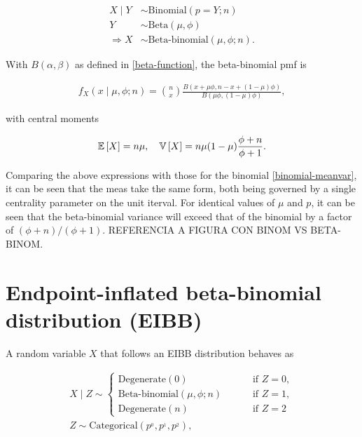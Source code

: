 \begin{equation}
\begin{split}
X \mid Y &\sim \text{Binomial}(p=Y; n)\\
Y &\sim \text{Beta}(\mu, \phi)\\
\Rightarrow X &\sim \text{Beta-binomial}(\mu, \phi; n).
\end{split}
\end{equation}

With $B(\alpha,\beta)$ as defined in \ref{beta-function}, the beta-binomial pmf is

\begin{equation}
\begin{split}
f_X(x \mid \mu, \phi; n) = \binom{n}{x}\frac{B(x+\mu\phi, n - x + (1-\mu)\phi)}{B(\mu\phi, (1-\mu)\phi)},
\end{split}
\label{betabinomial-pmf}
\end{equation}

with central moments

\begin{equation}
\begin{split}
{\mathbb E}\left[ X \right] = n\mu, \quad {\mathbb V}\left[ X \right] = n\mu(1-\mu)\frac{\phi+n}{\phi+1}.
\end{split}
\end{equation}

Comparing the above expressions with those for the binomial \ref{binomial-meanvar}, it can be seen that the meas take the same form, both being governed by a single centrality parameter on the unit iterval. For identical values of $\mu$ and $p$, it can be seen that the beta-binomial variance will exceed that of the binomial by a factor of $(\phi+n)/(\phi+1)$. REFERENCIA A FIGURA CON BINOM VS BETA-BINOM.

\section{Endpoint-inflated beta-binomial distribution (EIBB)}
\label{sec:eibb-dist}

A random variable $X$ that follows an EIBB distribution behaves as

\begin{equation}
\begin{split}
X \mid Z \sim
\begin{cases}
\text{Degenerate}(0) \qquad &\text{ if } Z=0,\\
\text{Beta-binomial}(\mu, \phi; n) \qquad &\text{ if } Z=1,\\
\text{Degenerate}(n) \qquad &\text{ if } Z=2
\end{cases}\\
Z \sim \text{Categorical}(p^{_0}, p^{_1}, p^{_2}),
\end{split}
\label{eibb-distribution}
\end{equation}

